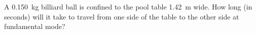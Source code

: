 \begin{example}
  A \SI{.150}{\kilo\gram} billiard ball is confined to the pool table
  \SI{1.42}{\metre} wide. How long (in seconds) will it take to travel from one
  side of the table to the other side at fundamental mode?
\end{example}



%
